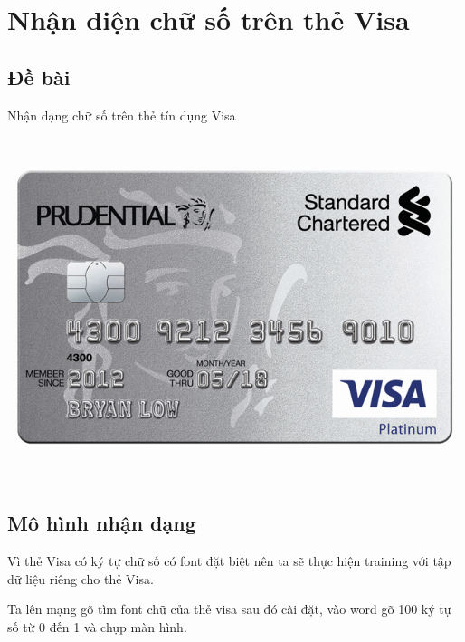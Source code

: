 \section{Nhận diện chữ số trên thẻ Visa}

\subsection{Đề bài}
Nhận dạng chữ số trên thẻ tín dụng Visa
\begin{center}
    \includegraphics[scale = 0.7]{images/Visa/inputVisa}
\end{center}

\subsection{Mô hình nhận dạng}


\quad Vì thẻ Visa có ký tự chữ số có font đặt biệt nên ta sẽ thực
hiện training với tập dữ liệu riêng cho thẻ Visa.

    \quad Ta lên mạng gõ tìm font chữ của thẻ visa sau đó cài đặt, vào word
gõ 100 ký tự số từ 0 đến 1 và chụp màn hình. 

